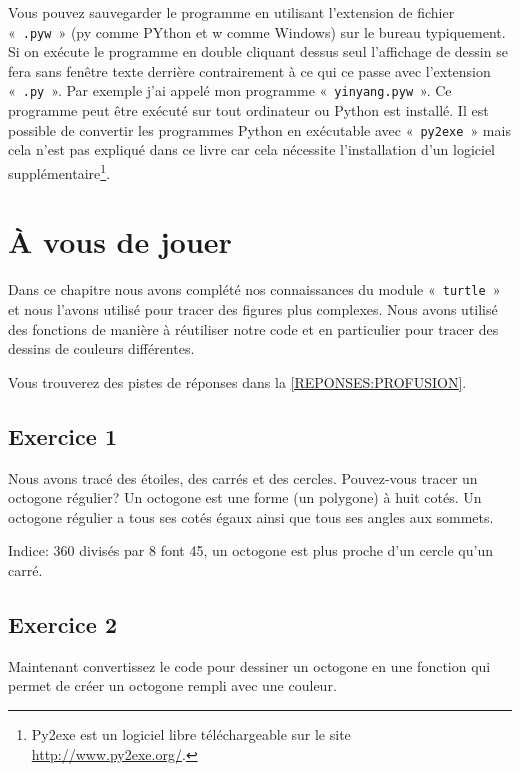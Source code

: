 Vous pouvez sauvegarder le programme en utilisant l'extension de fichier «~\texttt{.pyw}~» (py comme PYthon et w comme Windows) sur le bureau typiquement. Si on exécute le programme en double cliquant dessus seul l'affichage de dessin se fera sans fenêtre texte derrière contrairement à ce qui ce passe avec l'extension «~\texttt{.py}~». Par exemple j'ai appelé mon programme «~\texttt{yinyang.pyw}~». Ce programme peut être exécuté sur tout ordinateur ou Python est installé. Il est possible de convertir les programmes Python en exécutable avec «~\texttt{py2exe}~» mais cela n'est pas expliqué dans ce livre car cela nécessite l'installation d'un logiciel supplémentaire\footnote{Py2exe est un logiciel libre téléchargeable sur le site \url{http://www.py2exe.org/}.}.


\section{À vous de jouer\label{PRATIQUE:PROFUSION}}

Dans ce chapitre nous avons complété nos connaissances du module «~\texttt{turtle}~» et nous l'avons utilisé pour tracer des figures plus complexes. Nous avons utilisé des fonctions de manière à réutiliser notre code et en particulier pour tracer des dessins de couleurs différentes.

Vous trouverez des pistes de réponses dans la \autoref{REPONSES:PROFUSION}.


\subsection{Exercice 1}
Nous avons tracé des étoiles, des carrés et des cercles. Pouvez-vous tracer un octogone régulier? Un octogone est une forme (un polygone) à huit cotés. Un octogone régulier a tous ses cotés égaux ainsi que tous ses angles aux sommets.

Indice: 360 divisés par 8 font 45, un octogone est plus proche d'un cercle qu'un carré.

\subsection{Exercice 2}
Maintenant convertissez le code pour dessiner un octogone en une fonction qui permet de créer un octogone rempli avec une couleur.
